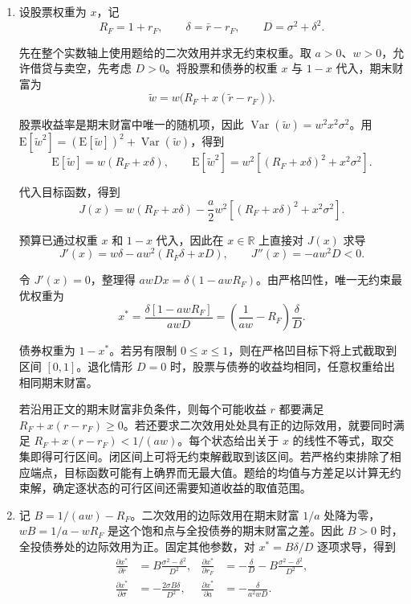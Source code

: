 \begin{solution}[blank-type=manual,blank-vsep=9\baselineskip]
\begin{enumerate}[label=(\alph*)]
\item 设股票权重为 $x$，记
\[
 R_F=1+r_F,\qquad \delta=\bar r-r_F,\qquad
 D=\sigma^2+\delta^2.
\]

先在整个实数轴上使用题给的二次效用并求无约束权重。取 $a>0$、$w>0$，允许借贷与卖空，先考虑 $D>0$。将股票和债券的权重 $x$ 与 $1-x$ 代入，期末财富为
\[
 \tilde w=w\bigl(R_F+x(\tilde r-r_F)\bigr).
\]

股票收益率是期末财富中唯一的随机项，因此 $\operatorname{Var}(\tilde w)=w^2x^2\sigma^2$。用 $\mathrm E[\tilde w^2]=(\mathrm E[\tilde w])^2+\operatorname{Var}(\tilde w)$，得到
\[
 \mathrm E[\tilde w]=w(R_F+x\delta),\qquad
 \mathrm E[\tilde w^2]=w^2[(R_F+x\delta)^2+x^2\sigma^2].
\]

代入目标函数，得到
\[
 J(x)=w(R_F+x\delta)
 -\frac a2w^2[(R_F+x\delta)^2+x^2\sigma^2].
\]

预算已通过权重 $x$ 和 $1-x$ 代入，因此在 $x\in\mathbb R$ 上直接对 $J(x)$ 求导
\[
 J'(x)=w\delta-aw^2(R_F\delta+xD),\qquad
 J''(x)=-aw^2D<0.
\]

令 $J'(x)=0$，整理得 $awDx=\delta(1-awR_F)$。由严格凹性，唯一无约束最优权重为
\[
 x^*=\frac{\delta[1-awR_F]}{awD}
    =\left(\frac1{aw}-R_F\right)\frac\delta D.
\]

债券权重为 $1-x^*$。若另有限制 $0\le x\le1$，则在严格凹目标下将上式截取到区间 $[0,1]$。退化情形 $D=0$ 时，股票与债券的收益均相同，任意权重给出相同期末财富。

若沿用正文的期末财富非负条件，则每个可能收益 $r$ 都要满足 $R_F+x(r-r_F)\ge0$。若还要求二次效用处处具有正的边际效用，就要同时满足 $R_F+x(r-r_F)<1/(aw)$。每个状态给出关于 $x$ 的线性不等式，取交集即得可行区间。闭区间上可将无约束解截取到该区间。若严格约束排除了相应端点，目标函数可能有上确界而无最大值。题给的均值与方差足以计算无约束解，确定逐状态的可行区间还需要知道收益的取值范围。

\item 记 $B=1/(aw)-R_F$。二次效用的边际效用在期末财富 $1/a$ 处降为零，$wB=1/a-wR_F$ 是这个饱和点与全投债券的期末财富之差。因此 $B>0$ 时，全投债券处的边际效用为正。固定其他参数，对 $x^*=B\delta/D$ 逐项求导，得到
\[
\begin{aligned}
 \frac{\partial x^*}{\partial\bar r}
 &=B\frac{\sigma^2-\delta^2}{D^2},&
 \frac{\partial x^*}{\partial r_F}
 &=-\frac\delta D-B\frac{\sigma^2-\delta^2}{D^2},\\
 \frac{\partial x^*}{\partial\sigma}
 &=-\frac{2\sigma B\delta}{D^2},&
 \frac{\partial x^*}{\partial a}
 &=-\frac{\delta}{a^2wD}.
\end{aligned}
\]


\end{enumerate}
\end{solution}
